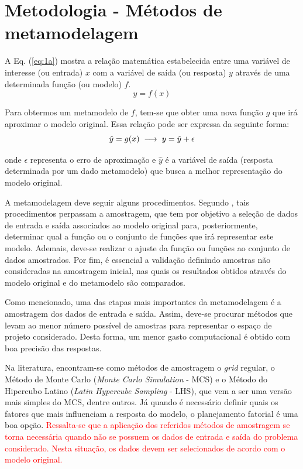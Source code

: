 \chapter{Metodologia - Métodos de metamodelagem} \label{chap_principios}

A Eq. (\ref{eq:1a}) mostra a relação matemática estabelecida entre uma variável de interesse (ou entrada) $x$ com a variável de saída (ou resposta) $y$ através de uma determinada função (ou modelo) $f$.
\begin{equation}
y = f(x)
\label{eq:1a}
\end{equation}

Para obtermos um metamodelo de $f$, tem-se que obter uma nova função $g$ que irá aproximar o modelo original. Essa relação pode ser expressa da seguinte forma:
\begin{equation}
\hat{y}= {g(x)} \hspace{0.1 cm} \longrightarrow \hspace{0.1 cm} y=\hat{y}+\epsilon
\end{equation}

\noindent onde $\epsilon$ representa o erro de aproximação e $\hat{y}$ é a variável de saída (resposta determinada por um dado metamodelo) que busca a melhor representação do modelo original. 

A metamodelagem deve seguir alguns procedimentos. Segundo , tais procedimentos perpassam a amostragem, que tem por objetivo a seleção de dados de entrada e saída associados ao modelo original para, posteriormente, determinar qual a função ou o conjunto de funções que irá representar este modelo. Ademais, deve-se realizar o ajuste da função ou funções ao conjunto de dados amostrados. Por fim, é essencial a validação definindo amostras não consideradas na amostragem inicial, nas quais os resultados obtidos através do modelo original e do metamodelo são comparados.

Como mencionado, uma das etapas mais importantes da metamodelagem é a amostragem dos dados de entrada e saída. Assim, deve-se procurar métodos que levam ao menor número possível de amostras para representar o espaço de projeto considerado. Desta forma, um menor gasto computacional é obtido com boa precisão das respostas. 

Na literatura, encontram-se como métodos de amostragem o {\it grid} regular, o Método de Monte Carlo (\textit{Monte Carlo Simulation} - MCS) e o Método do Hipercubo Latino (\textit{Latin Hypercube Sampling} - LHS), que vem a ser uma versão mais simples do MCS, dentre outros. Já quando é necessário definir quais os fatores que mais influenciam a resposta do modelo, o planejamento fatorial é uma boa opção. \textcolor{red}{Ressalta-se que a aplicação dos referidos métodos de amostragem se torna necessária quando não se possuem os dados de entrada e saída do problema considerado. Nesta situação, os dados devem ser selecionados de acordo com o modelo original.}

